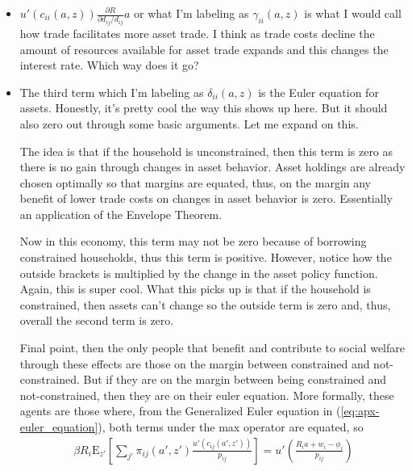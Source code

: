 \documentclass[12pt,pdftex]{article}
\begin{document}
\begin{onehalfspacing}
\begin{itemize}
\item $u'(c_{ii}(a,z))\frac{\partial R}{\partial d_{ij} / d_{ij}}a$ or what I'm labeling as $\gamma_{ii}(a,z)$ is what I would call how trade facilitates more asset trade. I think as trade costs decline the amount of resources available for asset trade expands and this changes the interest rate. Which way does it go?

\item The third term which I'm labeling as $\delta_{ii}(a,z)$  is the Euler equation for assets. Honestly, it's pretty cool the way this shows up here. But it should also zero out through some basic arguments. Let me expand on this. 

    The idea is that if the household is unconstrained, then this term is zero as there is no gain through changes in asset behavior. Asset holdings are already chosen optimally so that margins are equated, thus, on the margin any benefit of lower trade costs on changes in asset behavior is zero. Essentially an application of the Envelope Theorem.

    Now in this economy, this term may not be zero because of borrowing constrained households, thus this term is positive. However, notice how the outside brackets is multiplied by the change in the asset policy function. Again, this is super cool. What this picks up is that if the household is constrained, then assets can't change so the outside term is zero and, thus, overall the second term is zero. 
    
    Final point, then the only people that benefit and contribute to social welfare through these effects are those on the margin between constrained and not-constrained. But if they are on the margin between being constrained and not-constrained, then they are on their euler equation. More formally, these agents are those where, from the Generalized Euler equation in (\ref{eq:apx-euler_equation}), both terms under the max operator are equated, so
    \begin{align}
    \beta R_{i} \mathrm{E}_{z'} \left[ \sum_{j'} \pi_{ij}(a', z') \frac{u'(c_{ij}(a', z'))}{p_{ij}} \right]  = u' \left( \frac{R_i a + w_i - \phi_{i}}{p_{ij}} \right)
    \end{align}


\end{itemize}
\end{onehalfspacing}
\end{document}
